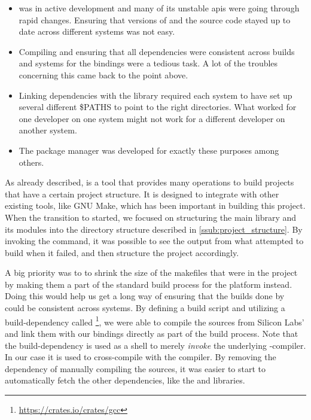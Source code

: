 \begin{itemize}
    \item {\rust} was in active development and many of its unstable \glspl{api} were going through rapid changes.
    Ensuring that versions of {\rustc} and the {\rust} source code stayed up to date across different systems was not easy.
    \item Compiling and ensuring that all dependencies were consistent across builds and systems for the bindings were a tedious task.
    A lot of the troubles concerning this came back to the point above.
    \item Linking dependencies with the library required each system to have set up several different \$PATHS to point to the right directories.
    What worked for one developer on one system might not work for a different developer on another system.
    \item The {\cargo} package manager was developed for exactly these purposes among others.
\end{itemize}

As already described, {\cargo} is a tool that provides many operations to build {\rust} projects that have a certain project structure.
It is designed to integrate with other existing tools, like GNU Make, which has been important in  building this project.
When the transition to {\cargo} started, we focused on structuring the main library and its modules into the directory structure described in \autoref{ssub:project_structure}.
By invoking the  command, it was possible to see the output from what {\cargo} attempted to build when it failed, and then structure the project accordingly.

A big priority was to to shrink the size of the makefiles that were in the project by making them a part of the standard build process for the {\rg} platform instead.
Doing this would help us get a long way of ensuring that the builds done by {\cargo} could be consistent across systems.
By defining a {\rust} build script and utilizing a {\rust} build-dependency called \footnote{\url{https://crates.io/crates/gcc}}, we were able to compile the {\C} sources from Silicon Labs' {\emlib} and link them with our bindings directly as part of the build process.
Note that the  build-dependency is used as a shell to merely \emph{invoke} the underlying {\C}-compiler.
In our case it is used to cross-compile with the {\armgcc} compiler.
By removing the dependency of manually compiling the {\C} sources, it was easier to start to automatically fetch the other dependencies, like the {\core} and  libraries.

